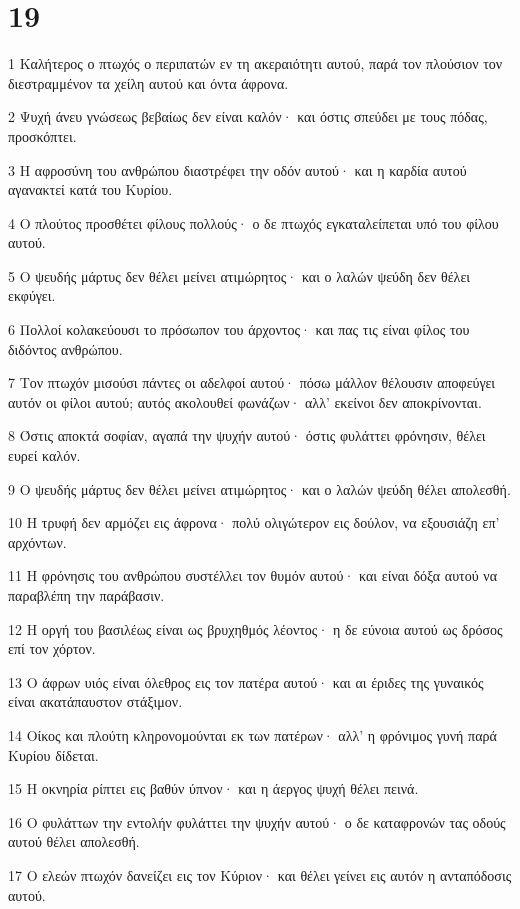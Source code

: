 \chapter{19}

\par 1 Καλήτερος ο πτωχός ο περιπατών εν τη ακεραιότητι αυτού, παρά τον πλούσιον τον διεστραμμένον τα χείλη αυτού και όντα άφρονα.
\par 2 Ψυχή άνευ γνώσεως βεβαίως δεν είναι καλόν· και όστις σπεύδει με τους πόδας, προσκόπτει.
\par 3 Η αφροσύνη του ανθρώπου διαστρέφει την οδόν αυτού· και η καρδία αυτού αγανακτεί κατά του Κυρίου.
\par 4 Ο πλούτος προσθέτει φίλους πολλούς· ο δε πτωχός εγκαταλείπεται υπό του φίλου αυτού.
\par 5 Ο ψευδής μάρτυς δεν θέλει μείνει ατιμώρητος· και ο λαλών ψεύδη δεν θέλει εκφύγει.
\par 6 Πολλοί κολακεύουσι το πρόσωπον του άρχοντος· και πας τις είναι φίλος του διδόντος ανθρώπου.
\par 7 Τον πτωχόν μισούσι πάντες οι αδελφοί αυτού· πόσω μάλλον θέλουσιν αποφεύγει αυτόν οι φίλοι αυτού; αυτός ακολουθεί φωνάζων· αλλ' εκείνοι δεν αποκρίνονται.
\par 8 Όστις αποκτά σοφίαν, αγαπά την ψυχήν αυτού· όστις φυλάττει φρόνησιν, θέλει ευρεί καλόν.
\par 9 Ο ψευδής μάρτυς δεν θέλει μείνει ατιμώρητος· και ο λαλών ψεύδη θέλει απολεσθή.
\par 10 Η τρυφή δεν αρμόζει εις άφρονα· πολύ ολιγώτερον εις δούλον, να εξουσιάζη επ' αρχόντων.
\par 11 Η φρόνησις του ανθρώπου συστέλλει τον θυμόν αυτού· και είναι δόξα αυτού να παραβλέπη την παράβασιν.
\par 12 Η οργή του βασιλέως είναι ως βρυχηθμός λέοντος· η δε εύνοια αυτού ως δρόσος επί τον χόρτον.
\par 13 Ο άφρων υιός είναι όλεθρος εις τον πατέρα αυτού· και αι έριδες της γυναικός είναι ακατάπαυστον στάξιμον.
\par 14 Οίκος και πλούτη κληρονομούνται εκ των πατέρων· αλλ' η φρόνιμος γυνή παρά Κυρίου δίδεται.
\par 15 Η οκνηρία ρίπτει εις βαθύν ύπνον· και η άεργος ψυχή θέλει πεινά.
\par 16 Ο φυλάττων την εντολήν φυλάττει την ψυχήν αυτού· ο δε καταφρονών τας οδούς αυτού θέλει απολεσθή.
\par 17 Ο ελεών πτωχόν δανείζει εις τον Κύριον· και θέλει γείνει εις αυτόν η ανταπόδοσις αυτού.
